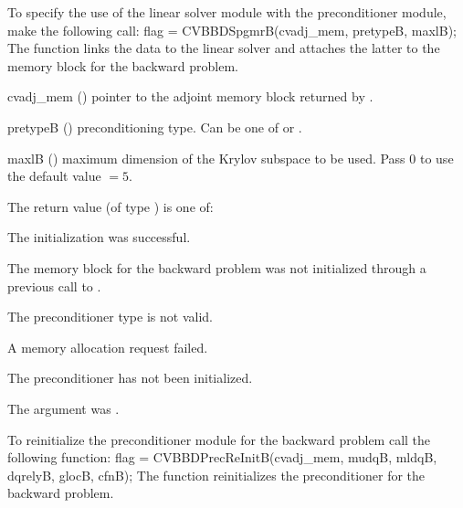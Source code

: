 {}
To specify the use of the {\cvspgmr} linear solver module with the {\cvbbdpre} 
preconditioner module, make the following call:
{
  flag = CVBBDSpgmrB(cvadj\_mem, pretypeB, maxlB);
}
{
  The function  links the {\cvbbdpre} data to the
  {\cvspgmr} linear solver and attaches the latter to the {\cvodes}
  memory block for the backward problem.
}
{
  \begin{args}
  \item[cvadj\_mem] ()
    pointer to the adjoint memory block returned by .
  \item[pretypeB] ()
    preconditioning type. Can be one of  or .
  \item[maxlB] ()
    maximum dimension of the Krylov subspace to be used. Pass $0$ to use the 
    default value $=5$.
  \end{args}
}
{
  The return value  (of type ) is one of:
  \begin{args}
  \item[\Id{CVSPGMR\_SUCCESS}] 
    The {\cvspgmr} initialization was successful.
  \item[\Id{CVSPGMR\_MEM\_NULL}]
    The {\cvodes} memory block for the backward problem was not initialized through a 
    previous call to .
  \item[\Id{CVSPGMR\_ILL\_INPUT}]
    The preconditioner type  is not valid.
  \item[\Id{CVSPGMR\_MEM\_FAIL}]
    A memory allocation request failed.
  \item[\Id{CV\_PDATA\_NULL}]
    The {\cvbbdpre} preconditioner has not been initialized.
  \item[\Id{CV\_ADJMEM\_NULL}]
    The  argument was .
  \end{args}
}
{}
To reinitialize the {\cvbbdpre} preconditioner module for the backward problem
call the following function:
{
  flag = CVBBDPrecReInitB(cvadj\_mem, mudqB, mldqB, dqrelyB, glocB, cfnB);
}
{
  The function  reinitializes the {\cvbbdpre} preconditioner
  for the backward problem.
}
